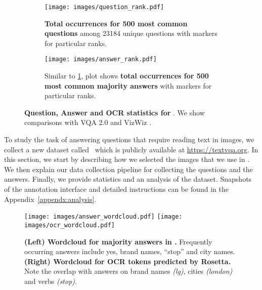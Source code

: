 \documentclass[10pt,twocolumn,letterpaper]{article}
\begin{document}
\begin{figure*}
    \begin{subfigure}[t]{0.32\textwidth}
        \texttt{[image: images/question\_rank.pdf]}
        \caption{
        \textbf{Total occurrences for 500 most common questions} among 23184 unique questions with markers for particular ranks.}
        \label{fig:question_rank}
    \end{subfigure}
    \hspace{1mm}
    \begin{subfigure}[t]{0.32\textwidth}
        \texttt{[image: images/answer\_rank.pdf]}
        \caption{Similar to \ref{fig:question_rank}, plot shows \textbf{total occurrences for 500 most common majority answers} with markers for particular ranks.}
        \label{fig:answer_rank}
    \end{subfigure}
    \vspace{-3mm}
    \caption{\textbf{Question, Answer and OCR statistics for \datasetName}. We show comparisons with VQA 2.0 \cite{balanced_vqa_v2} and VizWiz \cite{gurari2018vizwiz}.}
    \vspace{-5mm}
\end{figure*}
To study the task of answering questions that require reading text in
images, we collect a new dataset called \datasetName~which is publicly available at \underline{\href{https://textvqa.org/}{https://textvqa.org}}. In this section, we start by describing how we selected 
the images that we use 
in \datasetName. We then explain our data collection pipeline for collecting the questions and the answers. Finally, we provide statistics and an analysis of the dataset. Snapshots of the annotation interface and detailed instructions can be found in the Appendix~\ref{appendx:analysis}.

\begin{figure}[ht]
    \centering
    \texttt{[image: images/answer\_wordcloud.pdf]}
    \texttt{[image: images/ocr\_wordcloud.pdf]}
    \caption{\textbf{(Left) Wordcloud for majority answers in \datasetName.} Frequently occurring answers include yes, brand names, ``stop'' and city names. \textbf{(Right) Wordcloud for OCR tokens predicted by Rosetta.} Note the overlap with answers on brand names \textit{(lg)}, cities \textit{(london)} and verbs \textit{(stop)}.
    }
    \label{fig:wordcloud}
    \vspace{-3mm}
\end{figure}
\end{document}
